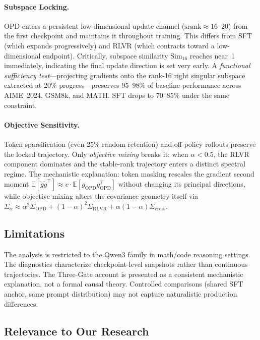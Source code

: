 \documentclass[11pt,a4paper]{article}
\begin{document}
\paragraph{Subspace Locking.} OPD enters a persistent low-dimensional update channel ($\mathrm{srank} \approx 16$--$20$) from the first checkpoint and maintains it throughout training. This differs from SFT (which expands progressively) and RLVR (which contracts toward a low-dimensional endpoint). Critically, subspace similarity $\mathrm{Sim}_{16}$ reaches near~1 immediately, indicating the final update direction is set very early. A \emph{functional sufficiency test}---projecting gradients onto the rank-16 right singular subspace extracted at 20\% progress---preserves 95--98\% of baseline performance across AIME~2024, GSM8k, and MATH. SFT drops to 70--85\% under the same constraint.

\paragraph{Objective Sensitivity.} Token sparsification (even 25\% random retention) and off-policy rollouts preserve the locked trajectory. Only \emph{objective mixing} breaks it: when $\alpha < 0.5$, the RLVR component dominates and the stable-rank trajectory enters a distinct spectral regime. The mechanistic explanation: token masking rescales the gradient second moment $\mathbb{E}[\tilde{g}\tilde{g}^\top] \approx c \cdot \mathbb{E}[g_{\mathrm{OPD}} g_{\mathrm{OPD}}^\top]$ without changing its principal directions, while objective mixing alters the covariance geometry itself via $\Sigma_\alpha \approx \alpha^2 \Sigma_{\mathrm{OPD}} + (1\!-\!\alpha)^2 \Sigma_{\mathrm{RLVR}} + \alpha(1\!-\!\alpha)\Sigma_{\mathrm{cross}}$.

\subsection{Limitations}

The analysis is restricted to the Qwen3 family in math/code reasoning settings. The diagnostics characterize checkpoint-level snapshots rather than continuous trajectories. The Three-Gate account is presented as a consistent mechanistic explanation, not a formal causal theory. Controlled comparisons (shared SFT anchor, same prompt distribution) may not capture naturalistic production differences.

\subsection{Relevance to Our Research}
\end{document}
